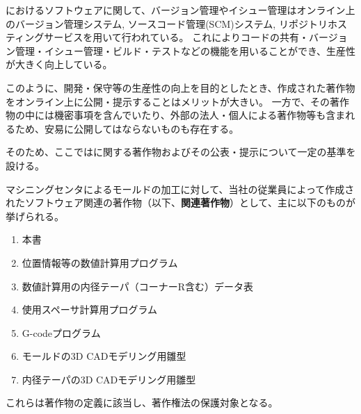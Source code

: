 

\DMname におけるソフトウェアに関して、バージョン管理やイシュー管理はオンライン上のバージョン管理システム, ソースコード管理(SCM)システム, リポジトリホスティングサービスを用いて行われている。
これによりコードの共有・バージョン管理・イシュー管理・ビルド・テストなどの機能を用いることができ、生産性が大きく向上している。

このように、開発・保守等の生産性の向上を目的としたとき、作成された著作物をオンライン上に公開・提示することはメリットが大きい。
一方で、その著作物の中には機密事項を含んでいたり、外部の法人・個人による著作物等も含まれるため、安易に公開してはならないものも存在する。

そのため、ここでは\DMname に関する著作物およびその公表・提示について一定の基準を設ける。



マシニングセンタによるモールドの加工に対して、当社の従業員によって作成されたソフトウェア関連の著作物（以下、\textbf{関連著作物}）として、主に以下のものが挙げられる。
\begin{enumerate}
\item 本書
\item 位置情報等の数値計算用プログラム
\item {}数値計算用の内径テーパ（コーナーR含む）データ表
\item {}使用スペーサ計算用プログラム
\item {}G-codeプログラム
\item {}モールドの3D CADモデリング用雛型
\item {}内径テーパの3D CADモデリング用雛型
\end{enumerate}
これらは著作物の定義に該当し、著作権法の保護対象となる。



